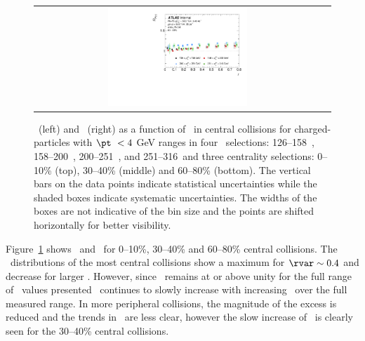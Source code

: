 \begin{figure}
{\begin{tabular}{cc}
	 \includegraphics[width=0.5\textwidth]{figures/main/results/RDpT_jetshape_cent5.pdf} \\
\end{tabular} }
   \caption{\RTheta\ (left) and \RP\ (right) as a function of \rvar\ in central collisions for charged-particles with $\pt\ < 4$ GeV ranges in four \ptjet\ selections: 126--158~\GeV, 158--200~\GeV, 200--251~\GeV, and 251--316~\GeV and three centrality selections: 0--10\% (top), 30--40\% (middle) and 60--80\% (bottom). The vertical bars on the data points indicate statistical uncertainties while the shaded boxes indicate systematic uncertainties. The widths of the boxes are not indicative of the bin size and the points are shifted horizontally for better visibility. }
      \label{fig:RPRT}
\end{figure}


Figure~\ref{fig:RPRT} shows \RTheta\ and \RP\ for 0--10\%, 30--40\% and 60--80\% central collisions.  The \RTheta\ 
distributions of the most central collisions show a maximum for $\rvar \sim 0.4$ and decrease for larger \rvar.
However, since \RTheta\ remains at or above unity for the full range of \rvar\ values presented \RP\ continues
to slowly increase with increasing \rvar\ over the full measured range.  In more peripheral collisions,
the magnitude of the excess is reduced and the trends in \RTheta\ are less clear, however the slow increase
of \RP\ is clearly seen for the 30--40\% central collisions.




\FloatBarrier
